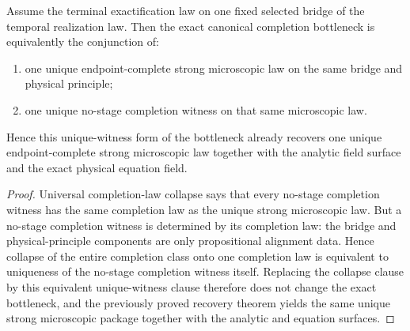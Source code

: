 \begin{theorem}
\label{thm:canonical-completion-bottleneck-iff-canonical-strong-microscopic-law-plus-unique-completion-witness}
Assume the terminal exactification law on one fixed selected bridge of the
temporal realization law. Then the exact canonical completion bottleneck is
equivalently the conjunction of:
\begin{enumerate}
\item one unique endpoint-complete strong microscopic law on the same bridge
and physical principle;
\item one unique no-stage completion witness on that same
microscopic law.
\end{enumerate}
Hence this unique-witness form of the bottleneck already recovers one unique
endpoint-complete strong microscopic law together with the analytic field
surface and the exact physical equation field.
\end{theorem}

\begin{proof}
Universal completion-law collapse says that every
no-stage
completion witness has the same completion law as the unique strong
microscopic law. But a no-stage completion witness is determined by its
completion law: the bridge and physical-principle components are only
propositional alignment data. Hence collapse of the entire completion class
onto one completion law is equivalent to uniqueness of the
no-stage completion witness itself. Replacing the collapse clause by this
equivalent unique-witness clause therefore does not change the exact
bottleneck, and the previously proved recovery theorem yields the same unique
strong microscopic package together with the analytic and equation surfaces.
\end{proof}

